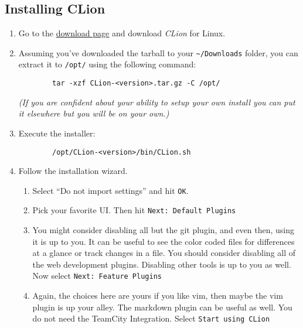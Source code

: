 \documentclass[../setup.tex]{subfiles}
\begin{document}
\subsection{Installing CLion}
\begin{enumerate}
	\item
    Go to the \href{https://www.jetbrains.com/clion/download/\#section=linux} {download page} and
    download \textit{CLion} for Linux.
	\item
    Assuming you've downloaded the tarball to your \lstinline{~/Downloads} folder, you can extract
    it to \lstinline{/opt/} using the following command:
  	\begin{lstlisting}
  		tar -xzf CLion-<version>.tar.gz -C /opt/
  	\end{lstlisting}
  	\textit{(If you are confident about your ability to setup your own install you can put it
    elsewhere but you will be on your own.)}
	\item
    Execute the installer:
  	\begin{lstlisting}
  		/opt/CLion-<version>/bin/CLion.sh
  	\end{lstlisting}
	\item
    Follow the installation wizard.
  	\begin{enumerate}
  		\item
        Select ``Do not import settings'' and hit \texttt{OK}.
  		\item
        Pick your favorite UI. Then hit \texttt{Next: Default Plugins}
  		\item
        You might consider disabling all but the git plugin, and even then, using it is up to you.
        It can be useful to see the color coded files for differences at a glance or track changes
        in a file. You should consider disabling all of the web development plugins. Disabling
        other tools is up to you as well. Now select \texttt{Next: Feature Plugins}
  		\item
        Again, the choices here are yours if you like vim, then maybe the vim plugin is up your
        alley. The markdown plugin can be useful as well. You do not need the TeamCity Integration.
        Select \texttt{Start using CLion}
  	\end{enumerate}
\end{enumerate}
\end{document}
